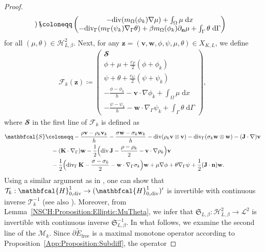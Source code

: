 \documentclass[11pt,reqno]{amsart}
\theoremstyle{remark}
\numberwithin{equation}{section}
\newcommand{\n}{\mathbf{n}}
\newcommand{\intO}{\int_\Omega}
\newcommand{\intG}{\int_\Gamma}
\newcommand{\dx}{\;\mathrm{d}x}
\newcommand{\dG}{\;\mathrm d\Ga}
\newcommand{\deln}{\partial_\n}
\newcommand{\Grad}{\nabla}
\newcommand{\Div}{\textnormal{div}}
\newcommand{\Gradg}{\nabla_\Ga}
\newcommand{\Divg}{\textnormal{div}_\Ga}
\newcommand{\Om}{\Omega}
\newcommand{\Ga}{\Gamma}
\newcommand{\J}{\mathbf J}
\newcommand{\K}{\mathbf K}
\newcommand{\bv}{\mathbf v}
\newcommand{\bw}{\mathbf w}
\newcommand{\free}{\mathrm{free}}
\begin{document}
\begin{proof}
\begin{align*}
\begin{pmatrix}
        \end{pmatrix}
        \coloneqq
        \begin{pmatrix}
            -\Div(m_\Om(\phi_k)\Grad\mu) + \intO\mu\dx \\
            -\Divg(m_\Ga(\psi_k)\Gradg\theta) + \beta m_\Om(\phi_k)\deln\mu + \intG \theta\dG
        \end{pmatrix}
    \end{align*}
    for all $(\mu,\theta)\in\mathcal{H}^2_{L,\beta}$. Next, for any $\mathbf{z} = (\bv,\bw,\phi,\psi,\mu,\theta)\in X_{K,L}$, we define
    \begin{align*}
        \mathcal{F}_k(\mathbf{z}) \coloneqq \begin{pmatrix}
            \mathbfcal{S} \\
            \phi + \mu + \frac{c_F}{2}(\phi + \phi_k) \\
            \psi + \theta + \frac{c_G}{2}(\psi + \psi_k) \\
            -\frac{\phi - \phi_k}{h} - \bv\cdot\Grad\phi_k + \intO \mu\dx \\
            -\frac{\psi - \psi_k}{h} - \bw\cdot\Gradg\psi_k + \intG \theta\dG
        \end{pmatrix},
    \end{align*}
    where $\mathbfcal{S}$ in the first line of $\mathcal{F}_k$ is defined as
    \begin{align*}
    	\mathbfcal{S} &\coloneqq -\frac{\rho\bv-\rho_k\bv_k}{h} - \frac{\sigma\bw-\sigma_k\bw_k}{h} - \Div(\rho_k\bv\otimes\bv) - \Divg(\sigma_k\bw\otimes\bw) - (\J\cdot\Grad)\bv \\
    	&\quad - (\K\cdot\Gradg)\bw - \frac12\Big(\Div\,\J - \frac{\rho-\rho_k}{2} - \bv\cdot\Grad\rho_k\Big)\bv \\
    	&\quad - \frac12\Big(\Divg\,\K - \frac{\sigma-\sigma_k}{2} - \bw\cdot\Gradg\sigma_k\Big)\bw + \mu\Grad\phi + \theta\Gradg\psi + \frac12(\J\cdot\n)\bw.
    \end{align*}
    Using a similar argument as in \cite[Section~3.1]{Gal2019}, one can show that $\mathcal{T}_k:\mathbfcal{H}^1_{0,\Div}\rightarrow(\mathbfcal{H}^1_{0,\Div})^\prime$ is invertible with continuous inverse $\mathcal{T}_k^{-1}$ (see also \cite[Lemma~3.1]{Gal2024}). Moreover, from Lemma~\ref{NSCH:Proposition:Elliptic:MuTheta}, we infer that $\mathfrak{S}_{L,\beta}:\mathcal{H}_{L,\beta}^2\rightarrow\mathcal{L}^2$ is invertible with continuous inverse $\mathfrak{S}_{L,\beta}^{-1}$. In what follows, we examine the second line of the $\mathcal{M}_k$. Since $\partial\widetilde E_\free$ is a maximal monotone operator according to Proposition~\ref{App:Proposition:Subdiff}, the operator

\end{proof}
\end{document}
